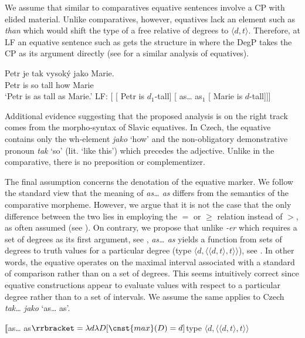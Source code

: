\documentclass[output=paper,
modfonts,
hidelinks,
newtxmath
]{langscibook}
\begin{document}
\noindent We assume that similar to comparatives equative sentences involve a CP with elided material. Unlike comparatives, however, equatives lack an element such as \textit{than} which would shift the type of a free relative of degrees to $\langle d,t\rangle$. Therefore, at LF an equative sentence such as  gets the structure in  where the DegP takes the CP as its argument directly (see \citealt{gobeski_morzycki2017percentages} for a similar analysis of equatives).

\ea \ea \gll Petr je tak vysoký jako Marie.\label{eq}\\
Petr is so tall how Marie\\
\glt `Petr is as tall as Marie.'
\ex LF: [ [ Petr is $d_1$-tall] [ as\dots{} as$_1$ [ Marie is $d$-tall]]]\label{eq-LF}
\z \z

\noindent Additional evidence suggesting that the proposed analysis is on the right track comes from the morpho-syntax of Slavic equatives. In Czech, the equative contains only the wh-element \textit{jako} `how' and the non-obligatory demonstrative pronoun \textit{tak} `so' (lit. `like this') which precedes the adjective. Unlike in the comparative, there is no preposition or complementizer. 

The final assumption concerns the denotation of the equative marker. We follow the standard view that the meaning of \textit{as\dots{} as} differs from the semantics of the comparative morpheme. However, we argue that it is not the case that the only difference between the two lies in employing the $=$ or $\geq$ relation instead of $>$, as often assumed (see \citealt{rett_measure_2015}). On contrary, we propose that unlike \textit{-er} which requires a set of degrees as its first argument, see , \textit{as\dots{} as} yields a function from sets of degrees to truth values for a particular degree (type $\langle d,\langle \langle d,t\rangle,t\rangle\rangle$), see . In other words, the equative operates on the maximal interval associated with a standard of comparison rather than on a set of degrees. This seems intuitively correct since equative constructions appear to evaluate values with respect to a particular degree rather than to a set of intervals. We assume the same applies to Czech \textit{tak\dots{} jako} `as\dots{} as'.

\ea $\llbracket$as{\dots} as$\rrbracket = \lambda d\lambda D[\cnst{max}(D) = d]$\hfill type $\langle d,\langle \langle d,t\rangle,t\rangle\rangle$\label{as-as-semantics}
\z
\end{document}
